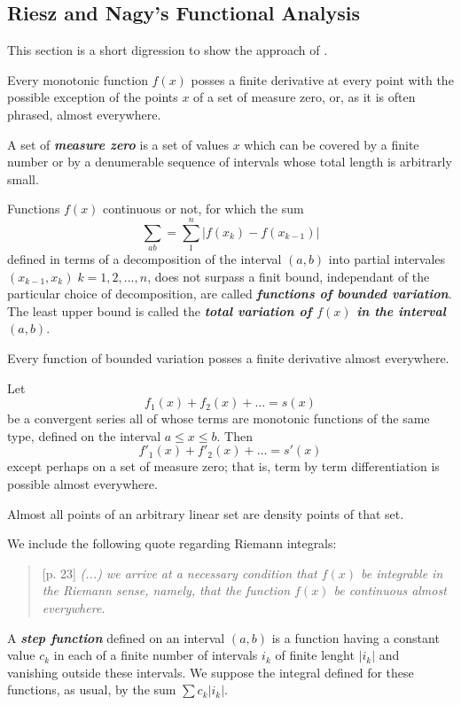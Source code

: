 \documentclass{article}
\theoremstyle{definition}
\numberwithin{equation}{section}
\begin{document}
\begin{itemize}
		\subsection{Riesz and Nagy's Functional Analysis}
		This section is a short digression to show the approach of \cite{riesz}.
		\begin{thm}[Lebesgue]
			Every monotonic function $f(x)$ posses a finite derivative at every point with the possible exception of the points $x$ of a set of measure zero, or, as it is often phrased, almost everywhere.
		\end{thm}
		A set of \textbf{\textit{measure zero}} is a set of values $x$ which can be covered by a finite number or by a denumerable sequence of intervals whose total length is arbitrarly small.
		
		Functions $f(x)$ continuous or not, for which the sum
		\[\sum_{ab}=\sum_1^n|f(x_k)-f(x_{k-1})|\]
		defined in terms of a decomposition of the interval $(a,b)$ into partial intervales $(x_{k-1},x_k)\;k=1,2,\ldots,n$, does not surpass a finit bound, independant of the particular choice of decomposition, are called \textbf{\textit{functions of bounded variation}}. The least upper bound is called the \textbf{\textit{total variation of $f(x)$ in the interval $(a,b)$}}.
		\begin{thm}[Lebesgue]
			Every function of bounded variation posses a finite derivative almost everywhere.
		\end{thm}
		\begin{thm}[Fubini]
			Let
			\[f_1(x)+f_2(x)+\ldots=s(x)\]
			be a convergent series all of whose terms are monotonic functions of the same type, defined on the interval $a\leq x\leq b$. Then
			\[f'_1(x)+f'_2(x)+\ldots=s'(x)\]
			except perhaps on a set of measure zero; that is, term by term differentiation is possible almost everywhere.
		\end{thm}
		\begin{thm}[Lebesgue]
			Almost all points of an arbitrary linear set are density points of that set.
		\end{thm}
		We include the following quote regarding Riemann integrals:
		\begin{quotation}[p. 23]
			\textit{(...) we arrive at a necessary condition that $f(x)$ be integrable in the Riemann sense, namely, that the function $f(x)$ be continuous almost everywhere.}
		\end{quotation}
		A \textbf{\textit{step function}} defined on an interval $(a,b)$ is a function having a constant value $c_k$ in each of a finite number of intervals $i_k$ of finite lenght $|i_k|$ and vanishing outside these intervals. We suppose the integral defined for these functions, as usual, by the sum $\sum c_k|i_k|$.

\end{itemize}
\end{document}
